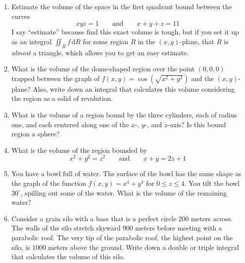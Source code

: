 \begin{enumerate}
    \item 
        Estimate the volume of the space in the first quadrant 
        bound between the curves
        \begin{equation*}
            xyz=1 \qquad\text{and}\qquad x+y+z = 11
        \end{equation*}
        I say ``estimate'' because find this exact volume is tough, 
        but if you set it up as an integral $\iint_R f \,\mathrm{d}R$
        for some region $R$ in the $(x,y)$-plane, 
        that $R$ is \emph{almost} a triangle,
        which allows you to get an easy estimate. 

    \item 
        What is the volume of the dome-shaped region over the point $(0,0,0)$
        trapped between the graph of $f(x,y) = \cos(\sqrt{x^2+y^2})$
        and the $(x,y)$-plane?
        Also, write down an integral that calculates
        this volume considering the region as a solid of revolution.

    \item 
        What is the volume of a region bound by the three cylinders,
        each of radius one, and each centered along one of the $x$-,
        $y$-, and $z$-axis?
        Is this bound region a sphere?

    \item 
        What is the volume of the region bounded by
        \begin{equation*}
            x^2+y^2=z^2
            \qquad
            \text{and}
            \qquad
            x+y=2z+1
        \end{equation*}

    \item 
        You have a bowl full of water. 
        The surface of the bowl has the same shape as the graph 
        of the function $f(x,y) = x^4+y^4$ for $0 \leq z \leq 4$.
        You tilt the bowl $30^\circ$, spilling out some of the water.
        What is the volume of the remaining water?

    \item
        Consider a grain silo with a base that is a perfect circle
        $200$ meters across. The walls of the silo stretch skyward $900$ meters
        before meeting with a parabolic roof.
        The very tip of the parabolic roof, 
        the highest point on the silo, is $1000$ meters above the ground. 
        Write down a double or triple integral
        that calculates the volume of this silo.


\end{enumerate}
